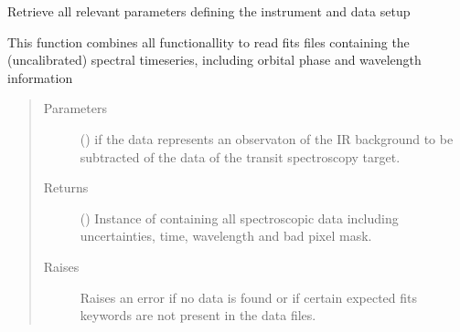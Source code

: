 \documentclass[a4paper,10pt,english]{sphinxmanual}
\begin{document}
\begin{fulllineitems}

\begin{fulllineitems}
\label{\detokenize{cascade.instruments:cascade.instruments.instruments.SpitzerIRS.get_instrument_setup}}
Retrieve all relevant parameters defining the instrument and data setup

\end{fulllineitems}


\begin{fulllineitems}
\label{\detokenize{cascade.instruments:cascade.instruments.instruments.SpitzerIRS.get_spectra}}
This function combines all functionallity to read fits files
containing the (uncalibrated) spectral timeseries, including
orbital phase and wavelength information
\begin{quote}\begin{description}
\item[{Parameters}] \leavevmode
{} () \textendash{} if  the data represents an observaton of the IR background
to be subtracted of the data of the transit spectroscopy target.

\item[{Returns}] \leavevmode
{} () \textendash{} Instance of  containing all spectroscopic
data including uncertainties, time, wavelength and bad pixel mask.

\item[{Raises}] \leavevmode
{} \textendash{} Raises an error if no data is found or if certain expected
fits keywords are not present in the data files.

\end{description}\end{quote}

\end{fulllineitems}



\end{fulllineitems}
\end{document}

